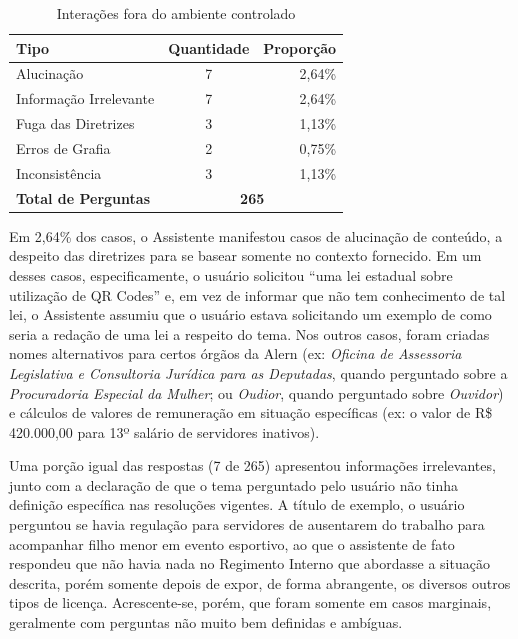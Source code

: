 \begin{table}[H]
    \centering
    \begin{tabular}{l c r}
        \hline
        \textbf{Tipo} &\textbf{Quantidade} & \textbf{Proporção} \\
        \hline
        Alucinação & 7 & 2,64\% \\
        Informação Irrelevante & 7 & 2,64\% \\
        Fuga das Diretrizes & 3 & 1,13\% \\
        Erros de Grafia & 2 & 0,75\% \\
        Inconsistência & 3 & 1,13\% \\
        \hline
        \textbf{Total de Perguntas} & \multicolumn{2}{c}{\textbf{265}} \\
        \hline
    \end{tabular}
    \caption{Interações fora do ambiente controlado}
    \label{tab:testes-interacoes-aberto-perguntas}
\end{table}

Em 2,64\% dos casos, o Assistente manifestou casos de alucinação de conteúdo, a despeito das diretrizes para se basear somente no contexto fornecido. Em um desses casos, especificamente, o usuário solicitou ``uma lei estadual sobre utilização de QR Codes'' e, em vez de informar que não tem conhecimento de tal lei, o Assistente assumiu que o usuário estava solicitando um exemplo de como seria a redação de uma lei a respeito do tema. Nos outros casos, foram criadas nomes alternativos para certos órgãos da Alern (ex: \textit{Oficina de Assessoria Legislativa e Consultoria Jurídica para as Deputadas}, quando perguntado sobre a \textit{Procuradoria Especial da Mulher}; ou \textit{Oudior}, quando perguntado sobre \textit{Ouvidor}) e cálculos de valores de remuneração em situação específicas (ex: o valor de R\$ 420.000,00 para 13º salário de servidores inativos).

Uma porção igual das respostas (7 de 265) apresentou informações irrelevantes, junto com a declaração de que o tema perguntado pelo usuário não tinha definição específica nas resoluções vigentes. A título de exemplo, o usuário perguntou se havia regulação para servidores de ausentarem do trabalho para acompanhar filho menor em evento esportivo, ao que o assistente de fato respondeu que não havia nada no Regimento Interno que abordasse a situação descrita, porém somente depois de expor, de forma abrangente, os diversos outros tipos de licença. Acrescente-se, porém, que foram somente em casos marginais, geralmente com perguntas não muito bem definidas e ambíguas.

